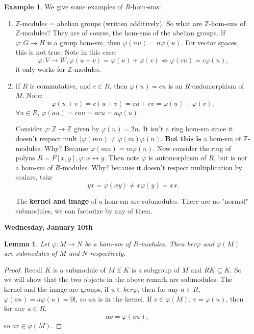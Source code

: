 \documentclass[9pt,reqno,twoside]{amsbook}
\theoremstyle{plain}
\numberwithin{section}{chapter}
\numberwithin{equation}{chapter}
\newtheorem{lem}[theorem]{Lemma}
\theoremstyle{definition}
\newtheorem{Ex}[theorem]{Example}
\theoremstyle{remark}
\theoremstyle{plain}
\newcommand{\sub}{\subseteq}
\renewcommand{\phi}{\varphi}
\begin{document}
\begin{Ex}
We give some examples of $R$-hom-sms:
\begin{enumerate}
\item $\mathbb{Z}$-modules = abelian groups (written additively). So what are $\mathbb{Z}$-hom-sms of $\mathbb{Z}$-modules? They are of course, the hom-sms of the abelian groups. If $\phi:G\to H$ is a group hom-sm, then $\phi(nu) = n\phi(u)$. For vector spaces, this is not true. Note in this case:
$$
\phi:V \to W, \phi(u + v) = \phi(u) + \phi(v) \nRightarrow \phi(cu) = c\phi(u),
$$
it only works for $\mathbb{Z}$-modules. 
\item If $R$ is commutative, and $c \in R$, then $\phi(u) = cu$ is an $R$-endomorphism of $M$. Note:
$$
\phi(u + v) = c(u + v)= cu+ cv = \phi(u) + \phi(v),
$$
$\forall a \in R$, $\phi(au) = cau = acu = a\phi(u)$. 
\vspace{3mm}

Consider $\phi:\mathbb{Z} \to \mathbb{Z}$ given by $\phi(n) = 2n$. It isn't a ring hom-sm since it doesn't respect mult ($\phi(mn) \neq \phi(m)\phi(n)$. \textbf{But this is} a hom-sm of $\mathbb{Z}$-modules. Why? Because $\phi(mn) = m\phi(n)$. Now consider the ring of polyns $R = F[x,y], \phi:x \leftrightarrow y$. Then note $\phi$ is automorphism of $R$, but is not a hom-sm of $R$-modules. Why? because it doesn't respect multiplication by scalars, take 
$$
yx = \phi(xy) \neq x\phi(y) = xx. 
$$

The \textbf{kernel and image} of a hom-sm are submodules. There are no "normal" submodules, we can factorize by any of them. 

\end{enumerate}
\end{Ex}

\textbf{Wednesday, January 10th}

\begin{lem}
Let $\phi:M \to N$ be a hom-sm of $R$-modules. Then ker$\phi$ and $\phi(M)$ are submodules of $M$ and $N$ respectively. 
\end{lem}

\begin{proof}
Recall $K$ is a submodule of $M$ if $K$ is a subgroup of $M$ and $RK \sub K$. So we will show that the two objects in the above remark are submodules. The kernel and the image are groups, if $u \in ker\phi$, then for any $a \in R$, $\phi(au) = a\phi(u) = 0$l, so $au$ is in the kernel. If $v \in \phi(M)$, $v = \phi(u)$, then for any $a \in R$,
$$
av = \phi(au),
$$
so $av \in \phi(M)$. 
\end{proof}
\end{document}
